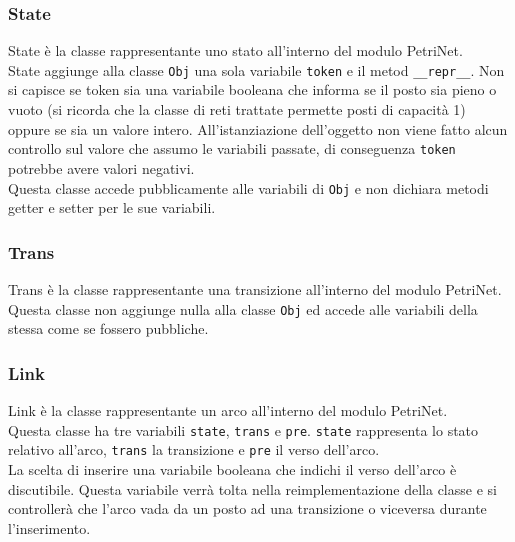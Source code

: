\documentclass[italian,12pt]{book}
\begin{document}
\subsubsection{State}
State è la classe rappresentante uno stato all'interno del modulo PetriNet.\\
State aggiunge alla classe {\tt Obj} una sola variabile {\tt token} e il metod {\tt \_\_repr\_\_}.
Non si capisce se token sia una variabile booleana che informa se il posto sia pieno o vuoto (si
ricorda che la classe di reti trattate permette posti di capacità 1) oppure se sia un valore intero. 
All'istanziazione dell'oggetto non viene fatto alcun controllo sul valore che assumo le variabili 
passate, di conseguenza {\tt token} potrebbe avere valori negativi.\\
Questa classe accede pubblicamente alle variabili di {\tt Obj} e non dichiara metodi
getter e setter per le sue variabili.

\subsubsection{Trans}
Trans è la classe rappresentante una transizione all'interno del modulo PetriNet.\\
Questa classe non aggiunge nulla alla classe {\tt Obj} ed accede alle variabili della stessa 
come se fossero pubbliche.

\subsubsection{Link}
Link è la classe rappresentante un arco all'interno del modulo PetriNet.\\
Questa classe ha tre variabili {\tt state}, {\tt trans} e {\tt pre}. {\tt state} rappresenta
lo stato relativo all'arco, {\tt trans} la transizione e {\tt pre} il verso dell'arco. \\
La scelta di inserire una variabile booleana che indichi il verso dell'arco è discutibile. 
Questa variabile verrà tolta nella reimplementazione della classe e si controllerà che l'arco
vada da un posto ad una transizione o viceversa durante l'inserimento.
\end{document}
